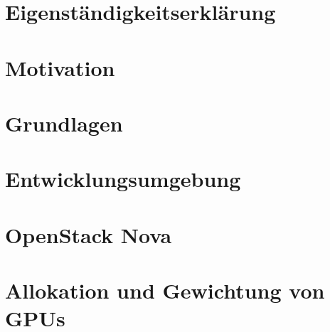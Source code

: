 \documentclass[ngerman, a4paper, 12pt, twoside]{article}
\numberwithin{equation}{section} %
\def\biblio{\clearpage} %
\begin{document}
\def\biblio{} %


\restoregeometry %

\thispagestyle{plain} %
\clearpage\mbox{}\clearpage %

\newpage
\section*{Eigenständigkeitserklärung}
    

\newpage
{} %
\section*{Motivation}
    
    
\newpage
{ %
\tableofcontents
}

\newpage
{} %
\setcounter{page}{1} %

\section{Grundlagen} %
\clearpage %

\section{Entwicklungsumgebung}
	
\clearpage

\section{OpenStack Nova}
	
\clearpage

\section{Allokation und Gewichtung von GPUs}
	
\clearpage
\end{document}
